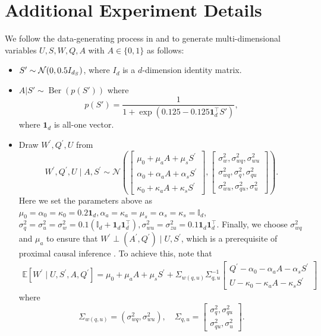 \section{Additional Experiment Details}\label{sec:exp-details}
We follow the data-generating process in \cite{kallus2021causal} and \cite{cui2020semiparametric} to generate multi-dimensional variables $U,S,W,Q,A$ with  $A\in\{0,1\}$ as follows: \begin{itemize}
    \item[1.]  $S'\sim \mathcal{N}(0, 0.5 I_{d_S})$, where $I_d$ is a $d$-dimension identity matrix.
    \item[2.] $A|S'\sim \operatorname{Ber}(p(S'))$ where $$
    p(S')  = \frac{1}{1+ \exp(0.125- 0.125\textbf{1}_d^\top S')},
    $$
    where $\textbf{1}_d$ is all-one vector.
    \item[3.] Draw $W^{\prime}, Q^{\prime}, U$ from
$$
W^{\prime}, Q^{\prime}, U \mid A, S^{\prime} \sim \mathcal{N}\left(\left[\begin{array}{c}
\mu_0+\mu_a A+\mu_s S^{\prime} \\
\alpha_0+\alpha_a A+\alpha_s S^{\prime} \\
\kappa_0+\kappa_a A+\kappa_s S^{\prime}
\end{array}\right],\left[\begin{array}{c}
\sigma_w^2, \sigma_{w q}^2, \sigma_{w u}^2 \\
\sigma_{w q}^2, \sigma_q^2, \sigma_{q u}^2 \\
\sigma_{w u}^2, \sigma_{q u}^2, \sigma_u^2
\end{array}\right]\right) .
$$
Here we set the parameters above as $\mu_0=\alpha_0=\kappa_0=0.2 \mathbf{1}_d, \alpha_a=\kappa_a=\mu_s=\alpha_s=\kappa_s=\mathbb{I}_d$, $\sigma_q^2=\sigma_u^2=\sigma_w^2=0.1\left(\mathbb{I}_d+\mathbf{1}_d \mathbf{1}_d^{\top}\right), \sigma_{w u}^2=\sigma_{z u}^2=0.1 \mathbf{1}_d \mathbf{1}_d^{\top}$. Finally, we choose $\sigma_{w q}^2$ and $\mu_a$ to ensure that $W^{\prime} \perp\left(A^{\prime}, Q^{\prime}\right) \mid U, S^{\prime}$, which is a prerequisite of proximal causal inference \citep[Condition 4 in Assumption 1]{kallus2021causal}. To achieve this, note that
\begin{align}\label{eq:exp-1}
\mathbb{E}\left[W^{\prime} \mid U, S^{\prime}, A, Q^{\prime}\right]=\mu_0+\mu_a A+\mu_s S^{\prime}+\Sigma_{w(q, u)} \Sigma_{q, u}^{-1}\left[\begin{array}{c}
Q^{\prime}-\alpha_0-\alpha_a A-\alpha_s S^{\prime} \\
U-\kappa_0-\kappa_a A-\kappa_s S^{\prime}
\end{array}\right]
\end{align}
where
$$
\Sigma_{w(q, u)}=\left(\sigma_{w q}^2, \sigma_{w u}^2\right), \quad \Sigma_{q, u}=\left[\begin{array}{l}
\sigma_q^2, \sigma_{q u}^2 \\
\sigma_{q u}^2, \sigma_u^2
\end{array}\right] .
$$


\end{itemize}
